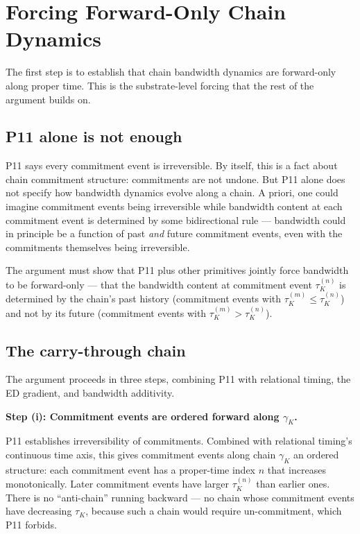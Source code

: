 \documentclass[11pt,a4paper]{article}
\begin{document}
\section{Forcing Forward-Only Chain Dynamics}

The first step is to establish that chain bandwidth dynamics are forward-only along proper time. This is the substrate-level forcing that the rest of the argument builds on.

\subsection{P11 alone is not enough}

P11 says every commitment event is irreversible. By itself, this is a fact about chain commitment structure: commitments are not undone. But P11 alone does not specify how bandwidth dynamics evolve along a chain. A priori, one could imagine commitment events being irreversible while bandwidth content at each commitment event is determined by some bidirectional rule --- bandwidth could in principle be a function of past \emph{and} future commitment events, even with the commitments themselves being irreversible.

The argument must show that P11 plus other primitives jointly force bandwidth to be forward-only --- that the bandwidth content at commitment event $\tau_K^{(n)}$ is determined by the chain's past history (commitment events with $\tau_K^{(m)} \leq \tau_K^{(n)}$) and not by its future (commitment events with $\tau_K^{(m)} > \tau_K^{(n)}$).

\subsection{The carry-through chain}

The argument proceeds in three steps, combining P11 with relational timing, the ED gradient, and bandwidth additivity.

\textbf{Step (i): Commitment events are ordered forward along $\gamma_K$.}

P11 establishes irreversibility of commitments. Combined with relational timing's continuous time axis, this gives commitment events along chain $\gamma_K$ an ordered structure: each commitment event has a proper-time index $n$ that increases monotonically. Later commitment events have larger $\tau_K^{(n)}$ than earlier ones. There is no ``anti-chain'' running backward --- no chain whose commitment events have decreasing $\tau_K$, because such a chain would require un-commitment, which P11 forbids.
\end{document}
